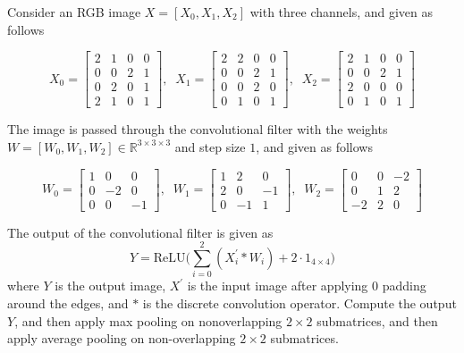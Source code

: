   \begin{example}
    Consider an RGB image $X = [X_0, X_1, X_2]$ with three channels, and given as follows 

    \begin{equation}
      X_0 = \begin{bmatrix} 2 & 1 & 0 & 0 \\ 0 & 0 & 2 & 1 \\ 0 & 2 & 0 & 1 \\ 2 & 1 & 0 & 1 \end{bmatrix}, \;\; 
      X_1 = \begin{bmatrix} 2 & 2 & 0 & 0 \\ 0 & 0 & 2 & 1 \\ 0 & 0 & 2 & 0 \\ 0 & 1 & 0 & 1 \end{bmatrix}, \;\; 
      X_2 = \begin{bmatrix} 2 & 1 & 0 & 0 \\ 0 & 0 & 2 & 1 \\ 2 & 0 & 0 & 0 \\ 0 & 1 & 0 & 1 \end{bmatrix}
      \label{eq:tarokh_conv_exercise}
    \end{equation}
    
    The image is passed through the convolutional filter with the weights $W = [W_0, W_1, W_2] \in \mathbb{R}^{3 \times 3 \times 3}$ and step size $1$, and given as follows 

    \begin{equation}
      W_0 = \begin{bmatrix} 1 & 0 & 0 \\ 0 & -2 & 0 \\ 0 & 0 & -1 \end{bmatrix}, \;\; 
      W_1 = \begin{bmatrix} 1 & 2 & 0 \\ 2 & 0 & - 1 \\ 0 & -1 & 1 \end{bmatrix}, \;\; 
      W_2 = \begin{bmatrix} 0 & 0 & -2 \\ 0 & 1 & 2 \\ -2 & 2 & 0 \end{bmatrix} 
      \label{eq:tarokh_conv_exercise2}
    \end{equation}   

    The output of the convolutional filter is given as 
    \begin{equation}
      Y = \mathrm{ReLU} \bigg( \sum_{i=0}^2 (X_i^\prime \ast W_i) + 2 \cdot 1_{4 \times 4}\bigg)
    \end{equation}
    where $Y$ is the output image, $X^\prime$ is the input image after applying $0$ padding around the edges, and $\ast$ is the discrete convolution operator. Compute the output $Y$, and then apply max pooling on nonoverlapping $2 \times 2$ submatrices, and then apply average pooling on non-overlapping $2 \times 2$ submatrices. 
  \end{example}

